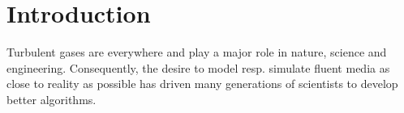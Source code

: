 \section{Introduction}

Turbulent gases are everywhere and play a major role in nature, science and
engineering. Consequently, the desire to model resp. simulate fluent media as
close to reality as possible has driven many generations of scientists to
develop better algorithms.

